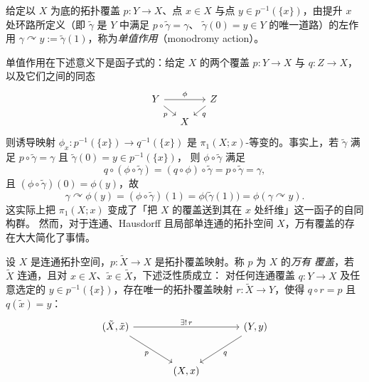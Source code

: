 \begin{definition}[单值作用]\label{def:2.2.2}
给定以 $X$ 为底的拓扑覆盖 $p:Y\to X$、点 $x\in X$ 与点 $y\in p^{-1}(\{x\})$，由提升
$x$ 处环路所定义（即 $\tilde\gamma$ 是 $Y$ 中满足 $p\circ\tilde\gamma=\gamma$、
$\tilde\gamma(0)=y\in Y$ 的唯一道路）的左作用
$\gamma\curvearrowright y:=\tilde\gamma(1)$，称为\emph{单值作用}（monodromy action）。
\end{definition}

单值作用在下述意义下是函子式的：给定 $X$ 的两个覆盖 $p:Y\to X$ 与 $q:Z\to X$，
以及它们之间的同态
\[
\begin{tikzcd}[column sep=small, row sep=small]
Y \arrow[rr, "\phi"] \arrow[dr, "p"'] & & Z \arrow[dl, "q"]\\
 & X &
\end{tikzcd}
\]
则诱导映射 $\phi_x:p^{-1}(\{x\})\to q^{-1}(\{x\})$ 是 $\pi_1(X;x)$-等变的。事实上，若
$\tilde\gamma$ 满足 $p\circ\tilde\gamma=\gamma$ 且 $\tilde\gamma(0)=y\in p^{-1}(\{x\})$，
则 $\phi\circ\tilde\gamma$ 满足
\[
q\circ(\phi\circ\tilde\gamma)=(q\circ\phi)\circ\tilde\gamma
=p\circ\tilde\gamma=\gamma,
\]
且 $(\phi\circ\tilde\gamma)(0)=\phi(y)$，故
\begin{equation}\label{eq:2.7}
\gamma\curvearrowright\phi(y)=(\phi\circ\tilde\gamma)(1)
=\phi\bigl(\tilde\gamma(1)\bigr)=\phi(\gamma\curvearrowright y).
\end{equation}
这实际上把 $\pi_1(X;x)$ 变成了「把 $X$ 的覆盖送到其在 $x$ 处纤维」这一函子的自同构群。
然而，对于连通、Hausdorff 且局部单连通的拓扑空间 $X$，万有覆盖的存在大大简化了事情。

\begin{definition}[万有覆盖]\label{def:2.2.3}
设 $X$ 是连通拓扑空间，$p:\tilde X\to X$ 是拓扑覆盖映射。称 $p$ 为 $X$ 的\emph{万有
覆盖}，若 $\tilde X$ 连通，且对 $x\in X$、$\tilde x\in\tilde X$，下述泛性质成立：
对任何连通覆盖 $q:Y\to X$ 及任意选定的 $y\in p^{-1}(\{x\})$，存在唯一的拓扑覆盖映射
$r:\tilde X\to Y$，使得 $q\circ r=p$ 且 $q(\tilde x)=y$：
\[
\begin{tikzcd}[column sep=large, row sep=large]
(\tilde X,\tilde x) \arrow[dr, "p"'] \arrow[rr, "\exists!\,r"] & & (Y,y) \arrow[dl, "q"]\\
 & (X,x) &
\end{tikzcd}
\]
\end{definition}

